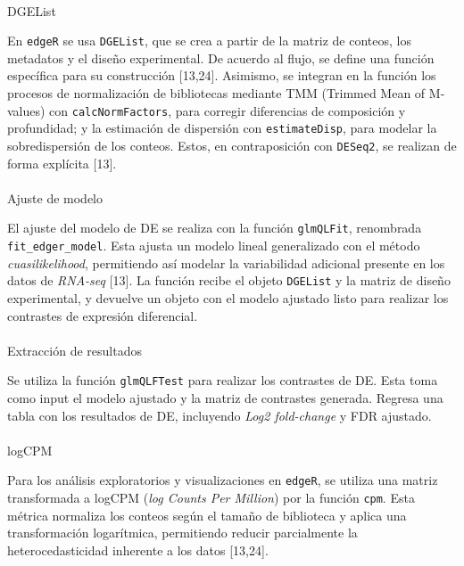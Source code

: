 \documentclass[
  12pt,
  letterpaper,
  DIV=11,
  numbers=noendperiod]{scrartcl}
\makeatletter
\let\oldparagraph\paragraph
\renewcommand{\paragraph}{
    \@ifstar
      \xxxParagraphStar
      \xxxParagraphNoStar
  }
\newcommand{\xxxParagraphStar}[1]{\oldparagraph*{#1}\mbox{}}
\newcommand{\xxxParagraphNoStar}[1]{\oldparagraph{#1}\mbox{}}
\makeatother
\begin{document}
\paragraph{DGEList}\label{dgelist}

En \texttt{edgeR} se usa \texttt{DGEList}, que se crea a partir de la
matriz de conteos, los metadatos y el diseño experimental. De acuerdo al
flujo, se define una función específica para su construcción
{[}13,24{]}. Asimismo, se integran en la función los procesos de
normalización de bibliotecas mediante TMM (Trimmed Mean of M-values) con
\texttt{calcNormFactors}, para corregir diferencias de composición y
profundidad; y la estimación de dispersión con \texttt{estimateDisp},
para modelar la sobredispersión de los conteos. Estos, en contraposición
con \texttt{DESeq2}, se realizan de forma explícita {[}13{]}.

\paragraph{Ajuste de modelo}\label{ajuste-de-modelo}

El ajuste del modelo de DE se realiza con la función \texttt{glmQLFit},
renombrada \texttt{fit\_edger\_model}. Esta ajusta un modelo lineal
generalizado con el método \emph{cuasilikelihood}, permitiendo así
modelar la variabilidad adicional presente en los datos de
\emph{RNA-seq} {[}13{]}. La función recibe el objeto \texttt{DGEList} y
la matriz de diseño experimental, y devuelve un objeto con el modelo
ajustado listo para realizar los contrastes de expresión diferencial.

\paragraph{Extracción de resultados}\label{extracciuxf3n-de-resultados}

Se utiliza la función \texttt{glmQLFTest} para realizar los contrastes
de DE. Esta toma como input el modelo ajustado y la matriz de contrastes
generada. Regresa una tabla con los resultados de DE, incluyendo
\emph{Log2 fold-change} y FDR ajustado.

\paragraph{logCPM}\label{logcpm}

Para los análisis exploratorios y visualizaciones en \texttt{edgeR}, se
utiliza una matriz transformada a logCPM (\emph{log Counts Per Million})
por la función \texttt{cpm}. Esta métrica normaliza los conteos según el
tamaño de biblioteca y aplica una transformación logarítmica,
permitiendo reducir parcialmente la heterocedasticidad inherente a los
datos {[}13,24{]}.
\end{document}
